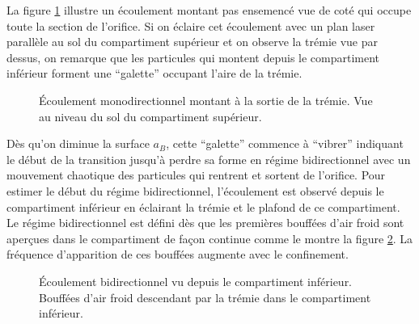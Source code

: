 La figure \ref{photo:mono} illustre un écoulement montant pas ensemencé vue de coté qui occupe toute la section de l'orifice. Si on éclaire cet écoulement avec un plan laser parallèle au sol du compartiment supérieur et on observe la trémie vue par dessus, on remarque que les particules qui montent depuis le compartiment inférieur forment une ``galette'' occupant l'aire de la trémie. 

\begin{figure}
\centering
{}
\caption{Écoulement monodirectionnel montant à la sortie de la trémie. Vue au niveau du sol du compartiment supérieur.}
\label{photo:mono}
\end{figure}

Dès qu'on diminue la surface $a_B$, cette ``galette'' commence à ``vibrer'' indiquant le début de la transition jusqu'à perdre sa forme en régime bidirectionnel avec un mouvement chaotique des particules qui rentrent et sortent de l'orifice. Pour estimer le début du régime bidirectionnel, l'écoulement est observé depuis le compartiment inférieur en éclairant la trémie et le plafond de ce compartiment. Le régime bidirectionnel est défini dès que les premières bouffées d'air froid sont aperçues dans le compartiment de façon continue comme le montre la figure \ref{photo:bouffe}. La fréquence d'apparition de ces bouffées augmente avec le confinement.

\begin{figure}
\centering
{}
\caption{Écoulement bidirectionnel vu depuis le compartiment inférieur. Bouffées d'air froid descendant par la trémie dans le compartiment inférieur.}
\label{photo:bouffe}
\end{figure}

